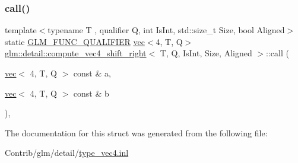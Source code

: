 \subsubsection{\texorpdfstring{call()}{call()}}
{\footnotesize\ttfamily template$<$typename T , qualifier Q, int Is\+Int, std\+::size\+\_\+t Size, bool Aligned$>$ \\
static \mbox{\hyperlink{setup_8hpp_a33fdea6f91c5f834105f7415e2a64407}{G\+L\+M\+\_\+\+F\+U\+N\+C\+\_\+\+Q\+U\+A\+L\+I\+F\+I\+ER}} \mbox{\hyperlink{structglm_1_1vec}{vec}}$<$4, T, Q$>$ \mbox{\hyperlink{structglm_1_1detail_1_1compute__vec4__shift__right}{glm\+::detail\+::compute\+\_\+vec4\+\_\+shift\+\_\+right}}$<$ T, Q, Is\+Int, Size, Aligned $>$\+::call (\begin{DoxyParamCaption}\item[{\mbox{\hyperlink{structglm_1_1vec}{vec}}$<$ 4, T, Q $>$ const \&}]{a,  }\item[{\mbox{\hyperlink{structglm_1_1vec}{vec}}$<$ 4, T, Q $>$ const \&}]{b }\end{DoxyParamCaption})\hspace{0.3cm}{\ttfamily [inline]}, {\ttfamily [static]}}



The documentation for this struct was generated from the following file\+:\begin{DoxyCompactItemize}
\item 
Contrib/glm/detail/\mbox{\hyperlink{type__vec4_8inl}{type\+\_\+vec4.\+inl}}\end{DoxyCompactItemize}
